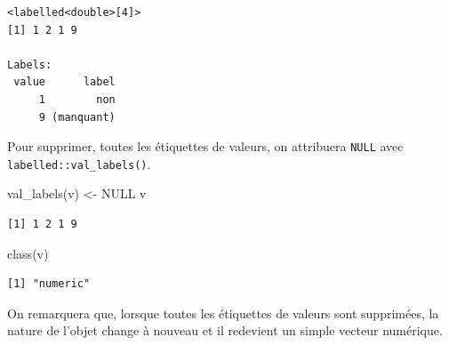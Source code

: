 \documentclass[
  letterpaper,
  DIV=11,
  numbers=noendperiod,
  oneside]{scrreprt}
\newenvironment{Shaded}{\begin{snugshade}}{\end{snugshade}}
\newcommand{\ConstantTok}[1]{\textcolor[rgb]{0.56,0.35,0.01}{#1}}
\newcommand{\FunctionTok}[1]{\textcolor[rgb]{0.28,0.35,0.67}{#1}}
\newcommand{\NormalTok}[1]{\textcolor[rgb]{0.00,0.23,0.31}{#1}}
\newcommand{\OtherTok}[1]{\textcolor[rgb]{0.00,0.23,0.31}{#1}}
\begin{document}
\begin{verbatim}
<labelled<double>[4]>
[1] 1 2 1 9

Labels:
 value      label
     1        non
     9 (manquant)
\end{verbatim}

Pour supprimer, toutes les étiquettes de valeurs, on attribuera
\texttt{NULL} avec \texttt{labelled::val\_labels()}.

\begin{Shaded}
\begin{Highlighting}[]
\FunctionTok{val\_labels}\NormalTok{(v) }\OtherTok{\textless{}{-}} \ConstantTok{NULL}
\NormalTok{v}
\end{Highlighting}
\end{Shaded}

\begin{verbatim}
[1] 1 2 1 9
\end{verbatim}

\begin{Shaded}
\begin{Highlighting}[]
\FunctionTok{class}\NormalTok{(v)}
\end{Highlighting}
\end{Shaded}

\begin{verbatim}
[1] "numeric"
\end{verbatim}

On remarquera que, lorsque toutes les étiquettes de valeurs sont
supprimées, la nature de l'objet change à nouveau et il redevient un
simple vecteur numérique.
\end{document}
